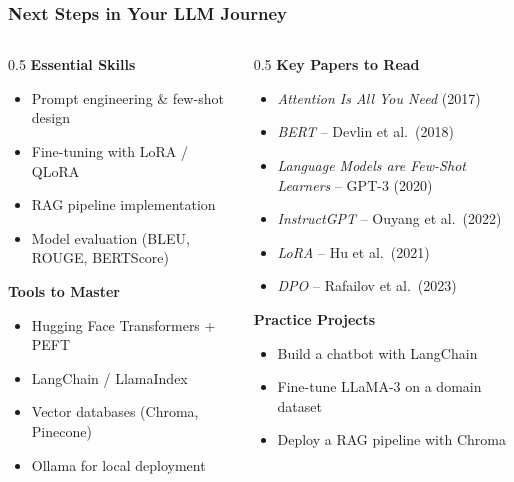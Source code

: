 \begin{frame}[fragile]\frametitle{Next Steps in Your LLM Journey}
\begin{columns}
  \begin{column}[T]{0.5\linewidth}
    \textbf{Essential Skills}
    \begin{itemize}
    \item Prompt engineering \& few-shot design
    \item Fine-tuning with LoRA / QLoRA
    \item RAG pipeline implementation
    \item Model evaluation (BLEU, ROUGE, BERTScore)
    \end{itemize}
    \textbf{Tools to Master}
    \begin{itemize}
    \item Hugging Face Transformers + PEFT
    \item LangChain / LlamaIndex
    \item Vector databases (Chroma, Pinecone)
    \item Ollama for local deployment
    \end{itemize}
  \end{column}
  \begin{column}[T]{0.5\linewidth}
    \textbf{Key Papers to Read}
    \begin{itemize}
    \item \emph{Attention Is All You Need} (2017)
    \item \emph{BERT} – Devlin et al.\ (2018)
    \item \emph{Language Models are Few-Shot Learners} – GPT-3 (2020)
    \item \emph{InstructGPT} – Ouyang et al.\ (2022)
    \item \emph{LoRA} – Hu et al.\ (2021)
    \item \emph{DPO} – Rafailov et al.\ (2023)
    \end{itemize}
    \textbf{Practice Projects}
    \begin{itemize}
    \item Build a chatbot with LangChain
    \item Fine-tune LLaMA-3 on a domain dataset
    \item Deploy a RAG pipeline with Chroma
    \end{itemize}
  \end{column}
\end{columns}
\end{frame}
